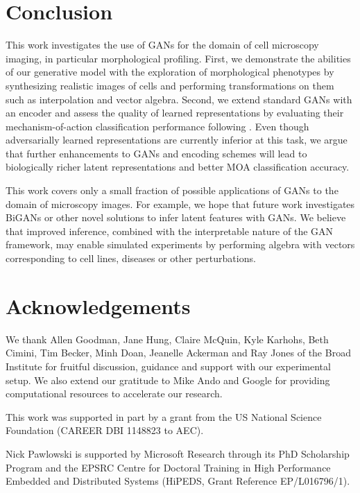 \documentclass{article}
\begin{document}
\section{Conclusion}
This work investigates the use of GANs for the domain of cell microscopy imaging, in particular morphological profiling. First, we demonstrate the abilities of our generative model with the exploration of morphological phenotypes by synthesizing realistic images of cells and performing transformations on them such as interpolation and vector algebra. Second, we extend standard GANs with an encoder and assess the quality of learned representations by evaluating their mechanism-of-action classification performance following \cite{Ljosa2013}. Even though adversarially learned representations are currently inferior at this task, we argue that further enhancements to GANs and encoding schemes will lead to biologically richer latent representations and better MOA classification accuracy.

This work covers only a small fraction of possible applications of GANs to the domain of microscopy images. For example, we hope that future work investigates BiGANs\cite{donahue2016adversarial} or other novel solutions to infer latent features with GANs. We believe that improved inference, combined with the interpretable nature of the GAN framework, may enable simulated experiments by performing algebra with vectors corresponding to cell lines, diseases or other perturbations.

\section*{Acknowledgements}
We thank Allen Goodman, Jane Hung, Claire McQuin, Kyle Karhohs, Beth Cimini, Tim Becker, Minh Doan, Jeanelle Ackerman and Ray Jones of the Broad Institute for fruitful discussion, guidance and support with our experimental setup. We also extend our gratitude to Mike Ando and Google for providing computational resources to accelerate our research.

This work was supported in part by a grant from the US National Science Foundation (CAREER DBI 1148823 to AEC).

Nick Pawlowski is supported by Microsoft Research through its PhD Scholarship Program and the EPSRC Centre for Doctoral Training in High Performance Embedded and Distributed Systems (HiPEDS, Grant Reference EP/L016796/1).



\end{document}
